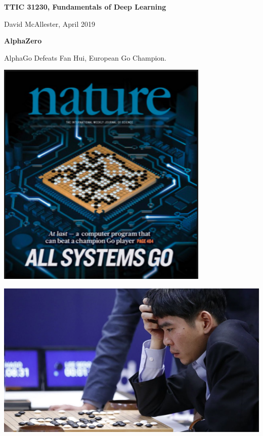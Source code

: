 




{\Huge

  \centerline{\bf TTIC 31230, Fundamentals of Deep Learning}
  \bigskip
  \centerline{David McAllester, April 2019}


\vfill
\centerline{\bf AlphaZero}
\vfill
\vfill


AlphaGo Defeats Fan Hui, European Go Champion.

\vfill
\centerline{\includegraphics[width=4in]{../images/alphago}}


\vfill
\centerline{\includegraphics[width=8in]{../images/alphagolee}}

}
